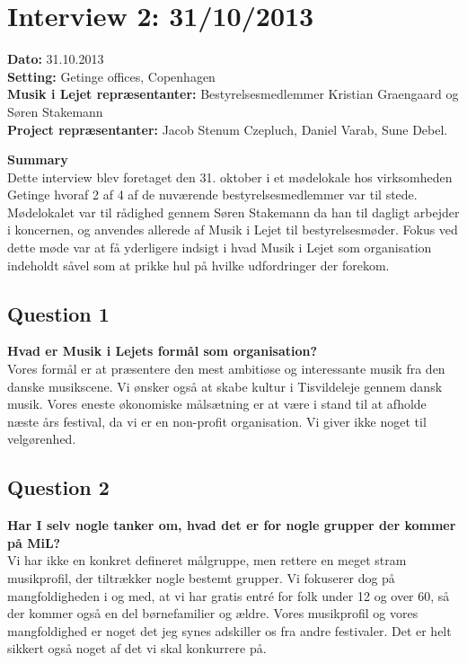 \section{Interview 2: 31/10/2013}
\label{interview_2}

\textbf{Dato:} 31.10.2013 \\
\textbf{Setting:} Getinge offices, Copenhagen \\
\textbf{Musik i Lejet repræsentanter:} Bestyrelsesmedlemmer Kristian Graengaard og Søren Stakemann \\
\textbf{Project repræsentanter:} Jacob Stenum Czepluch, Daniel Varab, Sune Debel.

\bigskip

\noindent \textbf{Summary} \\
Dette interview blev foretaget den 31. oktober i et mødelokale hos virksomheden Getinge hvoraf 2 af 4 af de nuværende bestyrelsesmedlemmer var til stede. Mødelokalet var til rådighed gennem Søren Stakemann da han til dagligt arbejder i koncernen, og anvendes allerede af Musik i Lejet til bestyrelsesmøder. Fokus ved dette møde var at få yderligere indsigt i hvad Musik i Lejet som organisation indeholdt såvel som at prikke hul på hvilke udfordringer der forekom.


\subsection{Question 1}
\label{i2q1}
\noindent \textbf{Hvad er Musik i Lejets formål som organisation?} \\
Vores formål er at præsentere den mest ambitiøse og interessante musik fra den danske musikscene. Vi ønsker også at skabe kultur i Tisvildeleje gennem dansk musik. Vores eneste økonomiske målsætning er at være i stand til at afholde næste års festival, da vi er en non-profit organisation. Vi giver ikke noget til velgørenhed. 

\subsection{Question 2}
\label{i2q2}
\noindent \textbf{Har I selv nogle tanker om, hvad det er for nogle grupper der kommer på MiL?} \\
Vi har ikke en konkret defineret målgruppe, men rettere en  meget stram musikprofil, der tiltrækker nogle bestemt grupper. Vi fokuserer dog på mangfoldigheden i og med, at vi har gratis entré for folk under 12 og over 60, så der kommer også en del børnefamilier og ældre. Vores musikprofil og vores mangfoldighed er noget det jeg synes adskiller os fra andre festivaler. Det er helt sikkert også noget af det vi skal konkurrere på.

